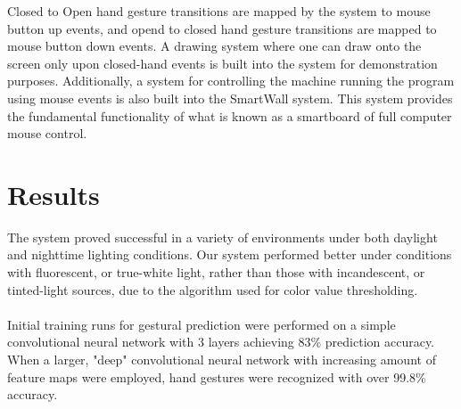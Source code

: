 \documentclass[twoside,twocolumn]{article}
\begin{document}
Closed to Open hand gesture transitions are mapped by the system to mouse button up events, and opend to closed hand gesture transitions are mapped to mouse button down events. A drawing system where one can draw onto the screen only upon closed-hand events is built into the system for demonstration purposes. Additionally, a system for controlling the machine running the program using mouse events is also built into the SmartWall system. This system provides the fundamental functionality of what is known as a smartboard of full computer mouse control.

\section{Results}
The system proved successful in a variety of environments under both daylight and nighttime lighting conditions. Our system performed better under conditions with fluorescent, or true-white light, rather than those with incandescent, or tinted-light sources, due to the algorithm used for color value thresholding. \\ \\Initial training runs for gestural prediction were performed on a simple convolutional neural network with 3 layers achieving 83\% prediction accuracy. When a larger, "deep" convolutional neural network with increasing amount of feature maps were employed, hand gestures were recognized with over 99.8\% accuracy.





\end{document}

